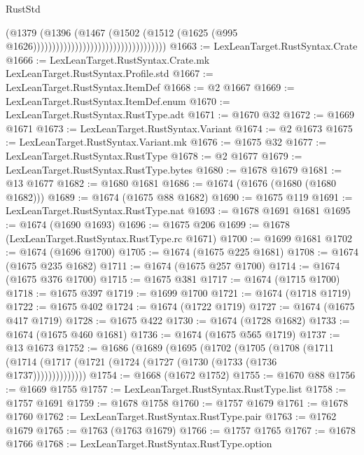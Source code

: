\begin{lexlean}{RustStd}
\begin{coremodule}
                                                            (@1379
                                                              (@1396
                                                                (@1467
                                                                  (@1502
                                                                    (@1512
                                                                      (@1625
                                                                        (@995
                                                                          @1626)))))))))))))))))))))))))))))))))))
@1663 := LexLeanTarget.RustSyntax.Crate
@1666 := LexLeanTarget.RustSyntax.Crate.mk LexLeanTarget.RustSyntax.Profile.std
@1667 := LexLeanTarget.RustSyntax.ItemDef
@1668 := @2 @1667
@1669 := LexLeanTarget.RustSyntax.ItemDef.enum
@1670 := LexLeanTarget.RustSyntax.RustType.adt
@1671 := @1670 @32
@1672 := @1669 @1671
@1673 := LexLeanTarget.RustSyntax.Variant
@1674 := @2 @1673
@1675 := LexLeanTarget.RustSyntax.Variant.mk
@1676 := @1675 @32
@1677 := LexLeanTarget.RustSyntax.RustType
@1678 := @2 @1677
@1679 := LexLeanTarget.RustSyntax.RustType.bytes
@1680 := @1678 @1679
@1681 := @13 @1677
@1682 := @1680 @1681
@1686 := @1674 (@1676 (@1680 (@1680 @1682)))
@1689 := @1674 (@1675 @88 @1682)
@1690 := @1675 @119
@1691 := LexLeanTarget.RustSyntax.RustType.nat
@1693 := @1678 @1691 @1681
@1695 := @1674 (@1690 @1693)
@1696 := @1675 @206
@1699 := @1678 (LexLeanTarget.RustSyntax.RustType.rc @1671)
@1700 := @1699 @1681
@1702 := @1674 (@1696 @1700)
@1705 := @1674 (@1675 @225 @1681)
@1708 := @1674 (@1675 @235 @1682)
@1711 := @1674 (@1675 @257 @1700)
@1714 := @1674 (@1675 @376 @1700)
@1715 := @1675 @381
@1717 := @1674 (@1715 @1700)
@1718 := @1675 @397
@1719 := @1699 @1700
@1721 := @1674 (@1718 @1719)
@1722 := @1675 @402
@1724 := @1674 (@1722 @1719)
@1727 := @1674 (@1675 @417 @1719)
@1728 := @1675 @422
@1730 := @1674 (@1728 @1682)
@1733 := @1674 (@1675 @460 @1681)
@1736 := @1674 (@1675 @565 @1719)
@1737 := @13 @1673
@1752 := @1686
    (@1689
      (@1695
        (@1702
          (@1705
            (@1708
              (@1711 (@1714 (@1717 (@1721 (@1724 (@1727 (@1730 (@1733 (@1736 @1737))))))))))))))
@1754 := @1668 (@1672 @1752)
@1755 := @1670 @88
@1756 := @1669 @1755
@1757 := LexLeanTarget.RustSyntax.RustType.list
@1758 := @1757 @1691
@1759 := @1678 @1758
@1760 := @1757 @1679
@1761 := @1678 @1760
@1762 := LexLeanTarget.RustSyntax.RustType.pair
@1763 := @1762 @1679
@1765 := @1763 (@1763 @1679)
@1766 := @1757 @1765
@1767 := @1678 @1766
@1768 := LexLeanTarget.RustSyntax.RustType.option

\end{coremodule}
\end{lexlean}
